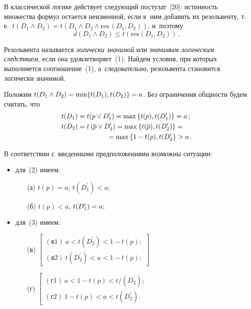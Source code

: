 \begin{multicols}{2}
  В классической логике действует следующий постулат~[20]: истинность 
множества формул остается неизменной, если к~ним добавить их резольвенту, 
т.\,е.\ $t(D_1\wedge D_2)=t(D_1\wedge D_2\wedge \mathrm{res}\,(D_1, D_2))$, и~поэтому
  \begin{equation}
  d\left( D_1\wedge D_2\right) \leq t\left( \mathrm{res} \left( D_1, D_2\right)\right)\,.
  \end{equation}
  
  Резольвента называется \textit{логически значимой} или \textit{значимым 
логическим следствием}, если она удовлетворяет~(1). Найдем условия, при 
которых выполняется соотношение~(1), а~следовательно, резольвента 
становится логически значимой.
  
  Положим $t(D_1\wedge D_2) \hm= \min \{t(D_1), t(D_2)\} \hm=a$. Без 
ограничения общности будем считать, что
  \begin{align}
  t(D_1) &= t(p\vee D_1^\prime)=\max \left\{ t(p),t(D_1^\prime)\right\}=a\,;
  \label{e2-les}\\
  t(D_2) &= t\left( \overline{p} \vee D_2^\prime\right) =\max \left\{ t(\overline{p}), 
t(D_2^\prime) \right\} ={}\notag\\
&\hspace*{15mm}{}=\max \left\{ 1-t(p), t(D_2^\prime\right\}>a\,.
  \label{e3-les}
  \end{align}
  
  В соответствии с~введенными предположениями возможны ситуации:
  \begin{itemize}
\item  для~(2) имеем:
\begin{itemize}
\item[(а)] $t(p)=a$, $t(D_1^\prime) <a$; 
\item[(б)] $t(p)<a$,  $t(D_1^\prime)\hm=a$;
\end{itemize}
  \item
  для~(3) имеем: 
  \begin{itemize}
  \item[(в)] $\left[    \begin{matrix} 
  (\mathrm{в}1)~a<t(D_2^\prime)<1-t(p);\\
  (\mathrm{в}2)~t(D_2^\prime) <a<1-t(p);
  \end{matrix}
  \right]$
\item[(г)] $\left[   \begin{matrix}
  (\mathrm{г}1)~a<1- t(p)<t/(D_2^\prime);\\
 (\mathrm{г}2)~1-t(p)<a<t(D_2^\prime).
  \end{matrix}
  \right.$
  \end{itemize}
  \end{itemize}
  

\end{multicols}
